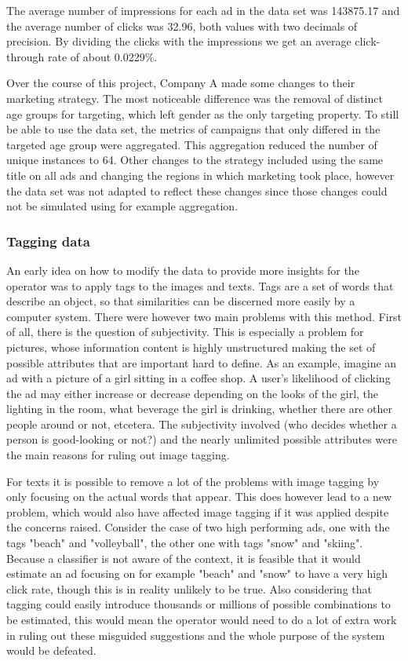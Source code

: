 \documentclass{sig-alternate}
\begin{document}
The average number of impressions for each ad in the data set was 143875.17 and the average number of clicks was 32.96, both values with two decimals of precision. By dividing the clicks with the impressions we get an average click-through rate of about 0.0229\%.

Over the course of this project, Company A made some changes to their marketing strategy. The most noticeable difference was the removal of distinct age groups for targeting, which left gender as the only targeting property. To still be able to use the data set, the metrics of campaigns that only differed in the targeted age group were aggregated. This aggregation reduced the number of unique instances to 64. Other changes to the strategy included using the same title on all ads and changing the regions in which marketing took place, however the data set was not adapted to reflect these changes since those changes could not be simulated using for example aggregation.

\subsubsection{Tagging data}
An early idea on how to modify the data to provide more insights for the operator was to apply tags to the images and texts. Tags are a set of words that describe an object, so that similarities can be discerned more easily by a computer system. There were however two main problems with this method. First of all, there is the question of subjectivity. This is especially a problem for pictures, whose information content is highly unstructured making the set of possible attributes that are important hard to define. As an example, imagine an ad with a picture of a girl sitting in a coffee shop. A user's likelihood of clicking the ad may either increase or decrease depending on the looks of the girl, the lighting in the room, what beverage the girl is drinking, whether there are other people around or not, etcetera. The subjectivity involved (who decides whether a person is good-looking or not?) and the nearly unlimited possible attributes were the main reasons for ruling out image tagging.

For texts it is possible to remove a lot of the problems with image tagging by only focusing on the actual words that appear. This does however lead to a new problem, which would also have affected image tagging if it was applied despite the concerns raised. Consider the case of two high performing ads, one with the tags "beach" and "volleyball", the other one with tags "snow" and "skiing". Because a classifier is not aware of the context, it is feasible that it would estimate an ad focusing on for example "beach" and "snow" to have a very high click rate, though this is in reality unlikely to be true. Also considering that tagging could easily introduce thousands or millions of possible combinations to be estimated, this would mean the operator would need to do a lot of extra work in ruling out these misguided suggestions and the whole purpose of the system would be defeated.
\end{document}

